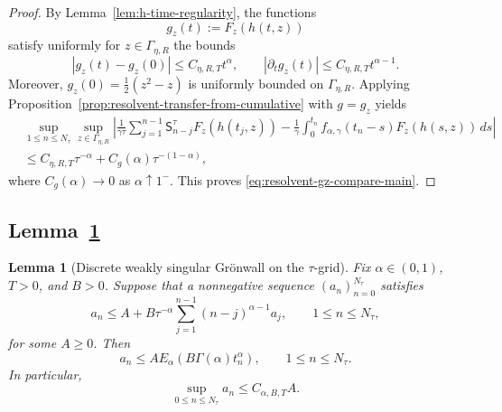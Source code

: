 \documentclass[letterpaper]{article}
\numberwithin{equation}{section}
\newtheorem{lemma}[theorem]{Lemma}
\theoremstyle{definition}
\theoremstyle{remark}
\begin{document}
\begin{proof}
By Lemma~\ref{lem:h-time-regularity}, the functions
\[
  g_z(t):=F_z(h(t,z))
\]
satisfy uniformly for $z\in\Gamma_{\eta,R}$ the bounds
\[
  |g_z(t)-g_z(0)|\le C_{\eta,R,T}t^\alpha,
  \qquad
  |\partial_t g_z(t)|\le C_{\eta,R,T}t^{\alpha-1}.
\]
Moreover,
$g_z(0)=\frac12(z^2-z)$
is uniformly bounded on $\Gamma_{\eta,R}$. Applying
Proposition~\ref{prop:resolvent-transfer-from-cumulative} with $g=g_z$ yields
\begin{align*}
  &\sup_{1\le n\le N_\tau}\sup_{z\in\Gamma_{\eta,R}}
  \left|
    \frac{1}{\gamma\tau}\sum_{j=1}^{n-1}\mathsf{S}_{n-j}^\tau F_z(h(t_j,z))
    -
    \frac1\gamma\int_0^{t_n}f_{\alpha,\gamma}(t_n-s)F_z(h(s,z))\,ds
  \right|\\
  &\le
  C_{\eta,R,T}\tau^{-\alpha}+C_{g}(\alpha)\tau^{-(1-\alpha)},
\end{align*}
where
$C_g(\alpha)\to0$
as $\alpha\uparrow1^-$.
This proves \eqref{eq:resolvent-gz-compare-main}.
\end{proof}

\subsection{Lemma~\ref{lem:discrete-weakly-singular-gronwall}}\label{app:proof-discrete-weakly-singular-gronwall}

\begin{lemma}[Discrete weakly singular Gr\"onwall on the $\tau$-grid]
\label{lem:discrete-weakly-singular-gronwall}
Fix $\alpha\in(0,1)$, $T>0$, and $B>0$. Suppose that a nonnegative sequence
$(a_n)_{n=0}^{N_\tau}$ satisfies
\begin{equation}\label{eq:discrete-weakly-singular-gronwall-assump}
  a_n\le A+B\tau^{-\alpha}\sum_{j=1}^{n-1}(n-j)^{\alpha-1}a_j,
  \qquad 1\le n\le N_\tau,
\end{equation}
for some $A\ge0$. Then
\begin{equation}\label{eq:discrete-weakly-singular-gronwall-concl}
  a_n\le A E_\alpha(B\Gamma(\alpha)t_n^\alpha),
  \qquad 1\le n\le N_\tau.
\end{equation}
In particular,
\[
  \sup_{0\le n\le N_\tau}a_n\le C_{\alpha,B,T}A.
\]
\end{lemma}
\end{document}

